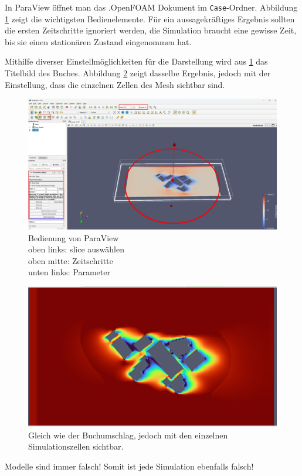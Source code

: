 In ParaView öffnet man das .OpenFOAM Dokument im \texttt{Case}-Ordner.
Abbildung \ref{fig:Beispiel_Paraview} zeigt die wichtigsten Bedienelemente.
Für ein aussagekräftiges Ergebnis sollten die ersten Zeitschritte ignoriert werden, die Simulation braucht eine gewisse Zeit, bis sie einen stationären Zustand eingenommen hat.

Mithilfe diverser Einstellmöglichkeiten für die Darstellung wird aus \ref{fig:Beispiel_Paraview} das Titelbild des Buches.
Abbildung \ref{fig:vorschWindWestBlocky} zeigt dasselbe Ergebnis, jedoch mit der Einstellung, dass die einzelnen Zellen des Mesh sichtbar sind.

\begin{figure}
    \centering
    \includegraphics[width=1\textwidth]{papers/openfoam/Bilder/Beispiel_Paraview.png}
    \caption{Bedienung von ParaView\\ oben links: slice auswählen\\ oben mitte: Zeitschritte\\ unten links: Parameter}
    \label{fig:Beispiel_Paraview}
\end{figure}

\begin{figure}
    \centering
    \includegraphics[width=1\textwidth]{papers/openfoam/Bilder/vorschlag_Wind_Westen_10m_blocky.png}
    \caption{Gleich wie der Buchumschlag, jedoch mit den einzelnen Simulationszellen sichtbar.}
    \label{fig:vorschWindWestBlocky}
\end{figure}

\begin{center}
        Modelle sind immer falsch! Somit ist jede Simulation ebenfalls falsch!
\end{center}
